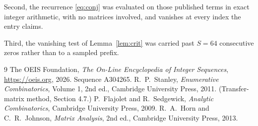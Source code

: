 \documentclass[11pt,a4paper]{article}
\theoremstyle{plain}
\theoremstyle{definition}
\begin{document}
Second, the recurrence \eqref{eq:conj} was evaluated on those published terms in exact
integer arithmetic, with no matrices involved, and vanishes at every index the entry claims.

Third, the vanishing test of Lemma~\ref{lem:crit} was carried past $S=64$ consecutive
zeros rather than to a sampled prefix.

\begin{thebibliography}{9}
 The OEIS Foundation, \emph{The On-Line Encyclopedia of Integer
Sequences}, \url{https://oeis.org}, 2026. Sequence A304265.
 R.~P.~Stanley, \emph{Enumerative Combinatorics}, Volume 1, 2nd ed.,
Cambridge University Press, 2011. (Transfer-matrix method, Section 4.7.)
 P.~Flajolet and R.~Sedgewick, \emph{Analytic Combinatorics}, Cambridge
University Press, 2009.
 R.~A.~Horn and C.~R.~Johnson, \emph{Matrix Analysis}, 2nd ed., Cambridge
University Press, 2013.
\end{thebibliography}
\end{document}
